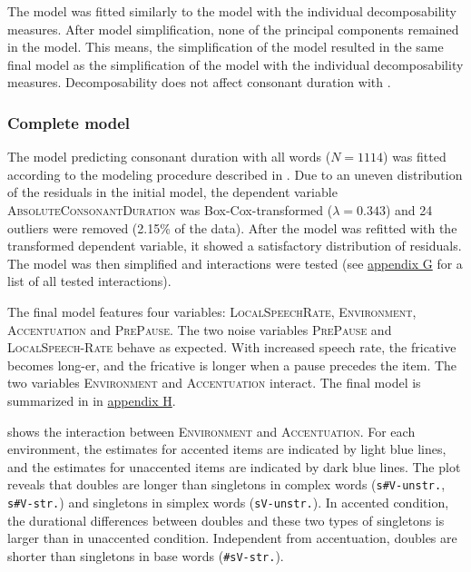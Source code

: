 The model was fitted similarly to the model with the individual decomposability measures. After model simplification, none of the principal components remained in the model. This means, the simplification of the model resulted in the same final model as the simplification of the model with the individual decomposability measures. Decomposability does not affect consonant duration with .


\subsubsection{Complete model}

The model predicting consonant duration with all words ($N=1114$) was fitted according to the modeling procedure described in . Due to an uneven distribution of the residuals in the initial model, the dependent variable \textsc{AbsoluteConsonantDuration} was Box-Cox-transformed ($\lambda = 0.343$) and 24 outliers were removed (2.15\% of the data). After the model was refitted with the transformed dependent variable, it showed a satisfactory distribution of residuals.  The model was then simplified and interactions were tested (see \hyperref[Appendix G Summaries of tested interactions in experimental study]{appendix G} for a list of all tested interactions). 

The final model features four variables: \textsc{LocalSpeechRate}, \textsc{Environment}, \textsc{Accentuation} and \textsc{PrePause}. The two noise variables \textsc{PrePause} and \textsc{LocalSpeech-Rate} behave as expected. With increased speech rate, the fricative becomes long-er, and the fricative is longer when a pause precedes the item.
 The two variables \textsc{Environment} and \textsc{Accentuation} interact. The final model is summarized in  in \hyperref[Appendix H: Model Summaries Experiment]{appendix H}.




 shows the interaction between \textsc{Environment} and \textsc{Accentuation}. For each environment, the estimates for accented items are indicated by light blue lines, and the estimates for unaccented items are indicated by dark blue lines.
The plot reveals that doubles are longer than singletons in complex words (\texttt{s\#V-unstr.}, \texttt{s\#V-str.}) and singletons in simplex words (\texttt{sV-unstr.}). In accented condition, the durational differences between doubles and these two types of singletons is larger than in unaccented condition. 
Independent from accentuation, doubles are shorter than singletons in base words (\texttt{\#sV-str.}).


